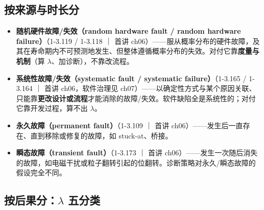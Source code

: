 \subsection{按来源与时长分}

\begin{itemize}
\item \textbf{随机硬件故障/失效（random hardware fault / random hardware failure）}（1-3.119 / 1-3.118 ｜ 首讲 ch06）——服从概率分布的硬件故障，及其在寿命期内不可预测地发生、但整体遵循概率分布的失效。对付它靠\textbf{度量与机制}（算 \(\lambda\)、加诊断），不靠改流程。
\item \textbf{系统性故障/失效（systematic fault / systematic failure）}（1-3.165 / 1-3.164 ｜ 首讲 ch06，软件治理见 ch07）——以确定性方式与某个原因关联、只能靠\textbf{更改设计或流程}才能消除的故障/失效。软件缺陷全是系统性的；对付它靠开发过程，算不出 \(\lambda\)。
\item \textbf{永久故障（permanent fault）}（1-3.109 ｜ 首讲 ch06）——发生后一直存在、直到移除或修复的故障，如 stuck-at、桥接。
\item \textbf{瞬态故障（transient fault）}（1-3.173 ｜ 首讲 ch06）——发生一次随后消失的故障，如电磁干扰或粒子翻转引起的位翻转。诊断策略对永久/瞬态故障的假设完全不同。
\end{itemize}

\subsection{按后果分：\(\lambda\) 五分类}

